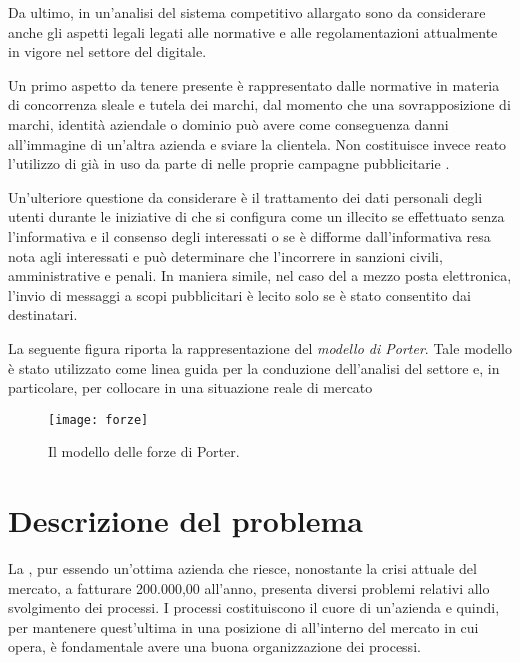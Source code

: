 Da ultimo, in un'analisi del sistema competitivo allargato sono da considerare anche gli aspetti legali legati alle normative e alle regolamentazioni attualmente in vigore nel settore del \mktg digitale.

Un primo aspetto da tenere presente è rappresentato dalle normative in materia di concorrenza sleale e tutela dei marchi, dal momento che una sovrapposizione di marchi, identità aziendale o dominio  può avere come conseguenza danni all'immagine di un'altra azienda e sviare la clientela. Non costituisce invece reato l'utilizzo di  già in uso da parte di  nelle proprie campagne pubblicitarie .

Un'ulteriore questione da considerare è il trattamento dei dati personali degli utenti durante le iniziative di \mktg che si configura come un illecito se effettuato senza l'informativa e il consenso degli interessati o se è difforme dall'informativa resa nota agli interessati e può determinare che l'incorrere in sanzioni civili, amministrative e penali. In maniera simile, nel caso del \mktg a mezzo posta elettronica, l'invio di messaggi a scopi pubblicitari è lecito solo se è stato consentito dai destinatari.

La seguente figura riporta la rappresentazione del \emph{modello di Porter}. Tale modello è stato utilizzato come linea guida per la conduzione dell'analisi del settore e, in particolare, per collocare \customer in una situazione reale di mercato

\begin{figure}[H]
  \centering
  \label{fig:forze}
  \texttt{[image: forze]}
  \caption{Il modello delle forze di Porter.}
\end{figure}

\section{Descrizione del problema}\label{sec:descrizioneproblema}
La \customer, pur essendo un'ottima azienda che riesce, nonostante la crisi attuale del mercato, a fatturare  200.000,00 \text{\euro} all'anno, presenta diversi problemi relativi allo svolgimento dei processi.
I processi costituiscono il cuore di un'azienda e quindi, per mantenere quest'ultima in una posizione di  all'interno del mercato in cui opera, è fondamentale avere una buona organizzazione dei processi.

